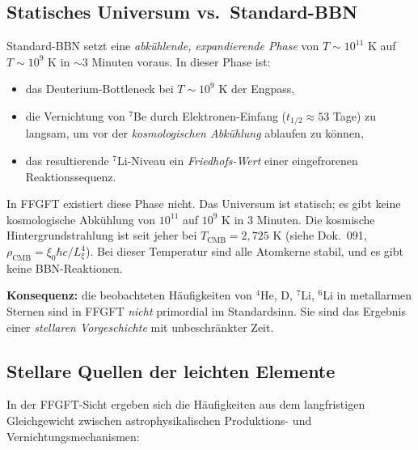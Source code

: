 \subsection{Statisches Universum vs.\ Standard-BBN}

Standard-BBN setzt eine \emph{abkühlende, expandierende Phase} von
$T \sim 10^{11}$ K auf $T \sim 10^{9}$ K in $\sim 3$ Minuten voraus.
In dieser Phase ist:
\begin{itemize}[leftmargin=2em,itemsep=2pt,topsep=2pt]
  \item das Deuterium-Bottleneck bei $T \sim 10^{9}$ K der Engpass,
  \item die Vernichtung von $^7$Be durch Elektronen-Einfang
        ($t_{1/2} \approx 53$ Tage) zu langsam, um vor der
        \emph{kosmologischen Abkühlung} ablaufen zu können,
  \item das resultierende $^7$Li-Niveau ein \emph{Friedhofs-Wert}
        einer eingefrorenen Reaktionssequenz.
\end{itemize}

In FFGFT existiert diese Phase nicht. Das Universum ist statisch;
es gibt keine kosmologische Abkühlung von $10^{11}$ auf $10^{9}$ K
in 3 Minuten. Die kosmische Hintergrundstrahlung ist seit jeher bei
$T_\text{CMB} = 2{,}725$ K (siehe Dok.~091, $\rho_\text{CMB}
= \xi_0 \hbar c / L_\xi^4$). Bei dieser Temperatur sind alle
Atomkerne stabil, und es gibt keine BBN-Reaktionen.

\textbf{Konsequenz:} die beobachteten Häufigkeiten von $^4$He, D,
$^7$Li, $^6$Li in metallarmen Sternen sind in FFGFT \emph{nicht}
primordial im Standardsinn. Sie sind das Ergebnis einer
\emph{stellaren Vorgeschichte} mit unbeschränkter Zeit.

\subsection{Stellare Quellen der leichten Elemente}

In der FFGFT-Sicht ergeben sich die Häufigkeiten aus dem
langfristigen Gleichgewicht zwischen astrophysikalischen
Produktions- und Vernichtungsmechanismen:

